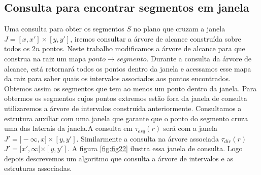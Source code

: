 \subsection{Consulta para encontrar segmentos em janela}
Uma consulta para obter os segmentos $S$  no plano que cruzam a janela $J=[x,x']\times[y, y']$, iremos consultar a árvore de alcance  construída sobre todos os $2n$ pontos. Neste trabalho modificamos a árvore de alcance para que construa na raiz um mapa $ponto \rightarrow segmento$. Durante a consulta da árvore de alcance, está retornará todos os pontos dentro da janela e acessamos esse mapa da raiz para saber quais os intervalos associados aos pontos encontrados. Obtemos assim os segmentos que tem ao menos um ponto dentro da janela.
Para obtermos os segmentos cujos pontos extremos estão fora da janela de consulta utilizaremos a árvore de intervalos construída anteriormente.  Consultamos a estrutura auxiliar com uma janela que garante que o ponto do segmento cruza uma das laterais da janela.A consulta em $\tau_{esq}(r)$ será com a janela $J'=]-\infty, x] \times [y, y']$. Similarmente a consulta na árvore associada $\tau_{dir}(r)$  $J'=[x', \infty[ \times [y, y']$. A figura \ref{fig:fig22} ilustra essa janela de consulta. Logo depois descrevemos um algoritmo que consulta a árvore de intervalos e as estruturas associadas.

